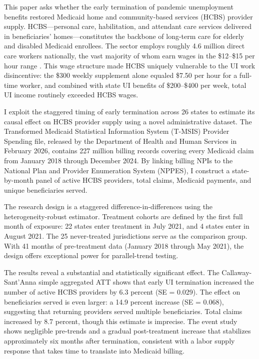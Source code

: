 \documentclass[12pt]{article}
\begin{document}
This paper asks whether the early termination of pandemic unemployment benefits restored Medicaid home and community-based services (HCBS) provider supply. HCBS---personal care, habilitation, and attendant care services delivered in beneficiaries' homes---constitutes the backbone of long-term care for elderly and disabled Medicaid enrollees. The sector employs roughly 4.6 million direct care workers nationally, the vast majority of whom earn wages in the \$12--\$15 per hour range \citep{phi2021}. This wage structure made HCBS uniquely vulnerable to the UI work disincentive: the \$300 weekly supplement alone equaled \$7.50 per hour for a full-time worker, and combined with state UI benefits of \$200--\$400 per week, total UI income routinely exceeded HCBS wages.

I exploit the staggered timing of early termination across 26 states to estimate its causal effect on HCBS provider supply using a novel administrative dataset. The Transformed Medicaid Statistical Information System (T-MSIS) Provider Spending file, released by the Department of Health and Human Services in February 2026, contains 227 million billing records covering every Medicaid claim from January 2018 through December 2024. By linking billing NPIs to the National Plan and Provider Enumeration System (NPPES), I construct a state-by-month panel of active HCBS providers, total claims, Medicaid payments, and unique beneficiaries served.

The research design is a staggered difference-in-differences using the \citet{callaway2021} heterogeneity-robust estimator. Treatment cohorts are defined by the first full month of exposure: 22 states enter treatment in July 2021, and 4 states enter in August 2021. The 25 never-treated jurisdictions serve as the comparison group. With 41 months of pre-treatment data (January 2018 through May 2021), the design offers exceptional power for parallel-trend testing.

The results reveal a substantial and statistically significant effect. The Callaway-Sant'Anna simple aggregated ATT shows that early UI termination increased the number of active HCBS providers by 6.3 percent (SE = 0.029). The effect on beneficiaries served is even larger: a 14.9 percent increase (SE = 0.068), suggesting that returning providers served multiple beneficiaries. Total claims increased by 8.7 percent, though this estimate is imprecise. The event study shows negligible pre-trends and a gradual post-treatment increase that stabilizes approximately six months after termination, consistent with a labor supply response that takes time to translate into Medicaid billing.
\end{document}
